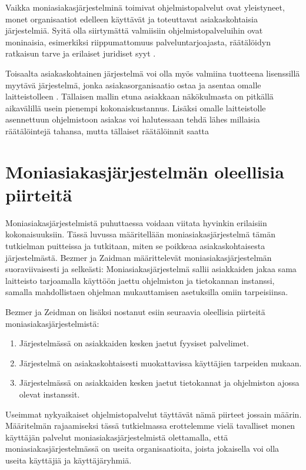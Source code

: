 Vaikka moniasiakasjärjestelminä toimivat ohjelmistopalvelut ovat yleistyneet, monet organisaatiot edelleen käyttävät ja toteuttavat asiakaskohtaisia järjestelmiä. Syitä olla siirtymättä valmiisiin ohjelmistopalveluihin ovat moninaisia, esimerkiksi riippumattomuus palveluntarjoajasta, räätälöidyn ratkaisun tarve ja erilaiset juridiset syyt \cite{janssen2011challenges}.

Toisaalta asiakaskohtainen järjestelmä voi olla myös valmiina tuotteena lisenssillä myytävä järjestelmä, jonka asiakasorganisaatio ostaa ja asentaa omalle laitteistolleen \cite{kinnunen2020yritysjarjestelmat}. Tällaisen mallin etuna asiakkaan näkökulmasta on pitkällä aikavälillä usein pienempi kokonaiskustannus. Lisäksi omalle laitteistolle asennettuun ohjelmistoon asiakas voi halutessaan tehdä lähes millaisia räätälöintejä tahansa, mutta tällaiset räätälöinnit saatta 

\section{Moniasiakasjärjestelmän oleellisia piirteitä}
Moniasiakasjärjestelmistä puhuttaessa voidaan viitata hyvinkin erilaisiin kokonaisuuksiin. Tässä luvussa määritellään moniasiakasjärjestelmä tämän tutkielman puitteissa ja tutkitaan, miten se poikkeaa asiakaskohtaisesta järjestelmästä. Bezmer ja Zaidman \cite{bezemer2010multi} määrittelevät moniasiakasjärjestelmän suoraviivaisesti ja selkeästi: Moniasiakasjärjestelmä sallii asiakkaiden jakaa sama laitteisto tarjoamalla käyttöön jaettu ohjelmiston ja tietokannan instanssi, samalla mahdollistaen ohjelman mukauttamisen asetuksilla omiin tarpeisiinsa.

Bezmer ja Zeidman on lisäksi nostanut esiin seuraavia oleellisia piirteitä moniasiakasjärjestelmistä:

\begin{enumerate}
  \item Järjestelmässä on asiakkaiden kesken jaetut fyysiset palvelimet.
  \item Järjestelmä on asiakaskohtaisesti muokattavissa käyttäjien tarpeiden mukaan.
  \item Järjestelmässä on asiakkaiden kesken jaetut tietokannat ja ohjelmiston ajossa olevat instanssit.
\end{enumerate}

Useimmat nykyaikaiset ohjelmistopalvelut täyttävät nämä piirteet jossain määrin. Määritelmän rajaamiseksi tässä tutkielmassa erottelemme vielä tavalliset monen käyttäjän palvelut moniasiakasjärjestelmistä olettamalla, että moniasiakasjärjestelmässä on useita organisaatioita, joista jokaisella voi olla useita käyttäjiä ja käyttäjäryhmiä.

